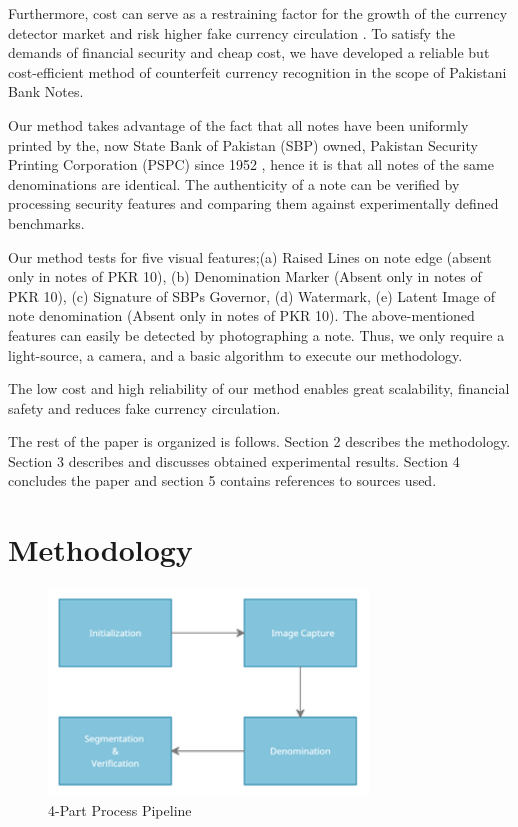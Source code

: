 \documentclass{article}
\begin{document}
Furthermore, cost can serve as a restraining factor for the growth of the currency detector market and risk higher fake currency circulation \cite{ScaleUp_MLSP:4}. To satisfy the demands of financial security and cheap cost, we have developed a reliable but cost-efficient method of counterfeit currency recognition in the scope of Pakistani Bank Notes.

Our method takes advantage of the fact that all notes have been uniformly printed by the, now State Bank of Pakistan (SBP) owned, Pakistan Security Printing Corporation (PSPC) since 1952 \cite{ScaleUp_MLSP:12}, hence it is that all notes of the same denominations are identical. The authenticity of a note can be verified by processing security features and comparing them against experimentally defined benchmarks. 

Our method tests for five visual features;(a) Raised Lines on note edge (absent only in notes of PKR 10), (b) Denomination Marker (Absent only in notes of PKR 10), (c) Signature of SBPs Governor, (d) Watermark, (e) Latent Image of note denomination (Absent only in notes of PKR 10). The above-mentioned features can easily be detected by photographing a note. Thus, we only require a light-source, a camera, and a basic algorithm to execute our methodology. 

The low cost and high reliability of our method enables great scalability, financial safety and reduces fake currency circulation.

The rest of the paper is organized is follows. Section 2 describes the methodology. Section 3 describes and discusses obtained experimental results. Section 4 concludes the paper and section 5 contains references to sources used.




\section{Methodology}
\label{sec:methodology}

\begin{figure}[ht]

\begin{minipage}[b]{1.0\linewidth}
  \centering
  \centerline{\includegraphics[width=8.5cm]{methodology.png}}
  \vspace{-3mm}
\end{minipage}
%
\caption{4-Part Process Pipeline}
\label{fig:methodology}
\vspace{-3mm}
\end{figure}
\end{document}
